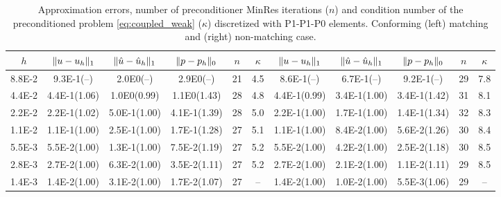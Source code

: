 \documentclass[r]{siamart171218}
\begin{document}


\begin{table}
  \begin{center}
    \scriptsize{
  \begin{tabular}{c|ccc|c|c||ccc|c|c}
    \hline
    $h$ & $\lVert{u-u_h}\rVert_1$ & $\lVert{\hat{u}-\hat{u}_h}\rVert_1$ & $\lVert{p-p_h}\rVert_0$ & $n$ & $\kappa$
        & $\lVert{u-u_h}\rVert_1$ & $\lVert{\hat{u}-\hat{u}_h}\rVert_1$ & $\lVert{p-p_h}\rVert_0$ & $n$ & $\kappa$ \\
    \hline
8.8E-2 & 9.3E-1(--)   & 2.0E0(--)    & 2.9E0(--)    & 21 & 4.5 & 8.6E-1(--)   & 6.7E-1(--)   & 9.2E-1(--)   & 29 & 7.8\\
4.4E-2 & 4.4E-1(1.06) & 1.0E0(0.99)  & 1.1E0(1.43)  & 28 & 4.8 & 4.4E-1(0.99) & 3.4E-1(1.00) & 3.4E-1(1.42) & 31 & 8.1\\
2.2E-2 & 2.2E-1(1.02) & 5.0E-1(1.00) & 4.1E-1(1.39) & 28 & 5.0 & 2.2E-1(1.00) & 1.7E-1(1.00) & 1.4E-1(1.34) & 32 & 8.3\\
1.1E-2 & 1.1E-1(1.00) & 2.5E-1(1.00) & 1.7E-1(1.28) & 27 & 5.1 & 1.1E-1(1.00) & 8.4E-2(1.00) & 5.6E-2(1.26) & 30 & 8.4\\
5.5E-3 & 5.5E-2(1.00) & 1.3E-1(1.00) & 7.5E-2(1.19) & 27 & 5.2 & 5.5E-2(1.00) & 4.2E-2(1.00) & 2.5E-2(1.18) & 30 & 8.5\\
2.8E-3 & 2.7E-2(1.00) & 6.3E-2(1.00) & 3.5E-2(1.11) & 27 & 5.2 & 2.7E-2(1.00) & 2.1E-2(1.00) & 1.1E-2(1.11) & 29 & 8.5\\
1.4E-3 & 1.4E-2(1.00) & 3.1E-2(1.00) & 1.7E-2(1.07) & 27 & --  & 1.4E-2(1.00) & 1.0E-2(1.00) & 5.5E-3(1.06) & 29 & -- \\
    \hline
  \end{tabular}
    }
    \caption{Approximation errors, number of preconditioner MinRes iterations ($n$) and
      condition number of the preconditioned problem \eqref{eq:coupled_weak} ($\kappa$) discretized
      with P1-P1-P0 elements. Conforming (left) matching and (right) non-matching case.}
  \label{tab:coupled_p1_p0}
  \end{center}
\end{table}


\end{document}
